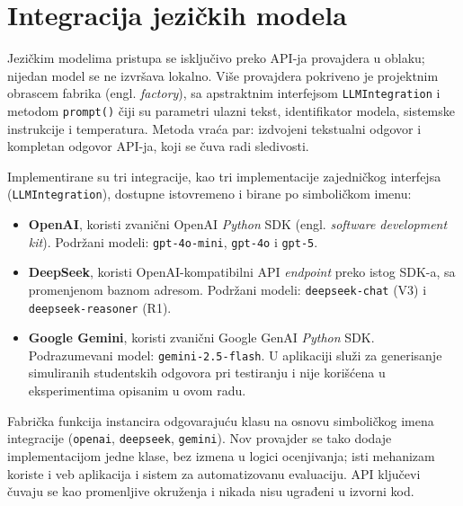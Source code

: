 \section{Integracija jezičkih modela}
\label{sec:integracije}

Jezičkim modelima pristupa se isključivo preko API-ja provajdera u oblaku;
nijedan model se ne izvršava lokalno.
Više provajdera pokriveno je projektnim obrascem fabrika (engl. \emph{factory}),
sa apstraktnim interfejsom \texttt{LLMIntegration} i metodom \texttt{prompt()} čiji su parametri ulazni tekst,
identifikator modela, sistemske instrukcije i temperatura.
Metoda vraća par: izdvojeni tekstualni odgovor i kompletan odgovor API-ja, koji se čuva radi sledivosti.

Implementirane su tri integracije, kao tri implementacije zajedničkog interfejsa
(\texttt{LLMIntegration}), dostupne istovremeno i birane po simboličkom imenu:

\begin{itemize}
    \item \textbf{OpenAI}, koristi zvanični OpenAI \emph{Python} SDK (engl. \emph{software development kit}).
    Podržani modeli: \texttt{gpt-\allowbreak 4o-\allowbreak mini}, \texttt{gpt-4o} i \texttt{gpt-5}.
    \item \textbf{DeepSeek}, koristi OpenAI-kompatibilni API \emph{endpoint} preko istog SDK-a, sa promenjenom baznom adresom.
    Podržani modeli: \texttt{deepseek-chat} (V3) i \texttt{deepseek-reasoner} (R1).
    \item \textbf{Google Gemini}, koristi zvanični Google GenAI \emph{Python} SDK.
    Podrazumevani model: \texttt{gemini-2.5-flash}.
    U aplikaciji služi za generisanje simuliranih studentskih odgovora pri testiranju
    i nije korišćena u eksperimentima opisanim u ovom radu.
\end{itemize}

Fabrička funkcija instancira odgovarajuću klasu na osnovu simboličkog imena integracije
(\texttt{openai}, \texttt{deepseek}, \texttt{gemini}).
Nov provajder se tako dodaje implementacijom jedne klase, bez izmena u logici ocenjivanja;
isti mehanizam koriste i veb aplikacija i sistem za automatizovanu evaluaciju.
API ključevi čuvaju se kao promenljive okruženja i nikada nisu ugrađeni u izvorni kod.
